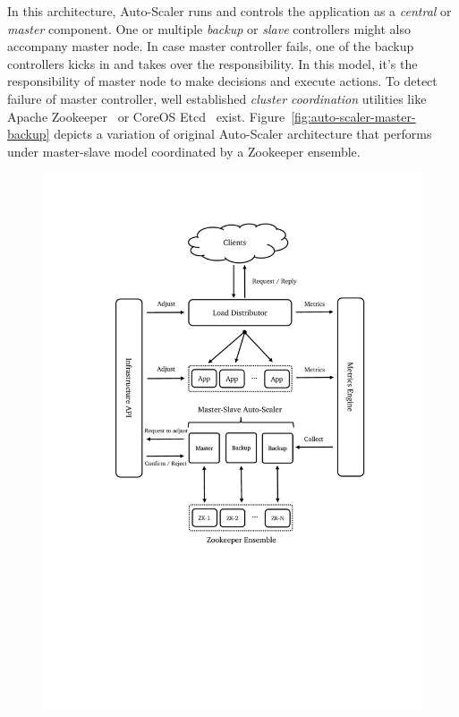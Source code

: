 \begin{description}[leftmargin=0pt]
    \item[Global Controller] In this architecture, Auto-Scaler runs and controls the application as a \emph{central} or \emph{master} component. One or multiple \emph{backup} or \emph{slave} controllers might also accompany master node. In case master controller fails, one of the backup controllers kicks in and takes over the responsibility. In this model, it's the responsibility of master node to make decisions and execute actions. To detect failure of master controller, well established \emph{cluster coordination} utilities like Apache Zookeeper~\cite{zk} or CoreOS Etcd~\cite{etcd} exist. Figure~\ref{fig:auto-scaler-master-backup} depicts a variation of original Auto-Scaler architecture that performs under master-slave model coordinated by a Zookeeper ensemble.
    \begin{figure}[hb]
        \includegraphics[clip, trim=3cm 9cm 2.5cm 2.5cm]{auto-scaler-master-backup.pdf}

\end{figure}
\end{description}
